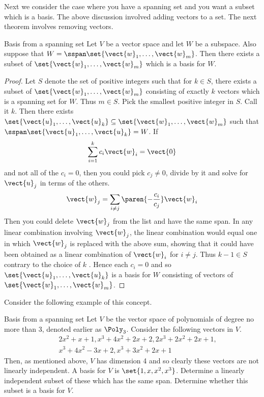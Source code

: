 Next we consider the case where you have a
spanning set and you want a subset which is a basis. The above discussion involved adding vectors to a set. The next theorem involves removing vectors. 

\begin{theorem}{Basis from a spanning set}{}
Let $V$ be a vector space and let $W$ be a subspace. Also
suppose that $W=\sspan\set{\vect{w}_{1},\ldots,\vect{w}
_{m}}$. Then there exists a subset of $\set{\vect{w}_{1},\ldots,
\vect{w}_{m}} $ which is a basis for $W$.
\end{theorem}

\begin{proof}
Let $S$ denote the set of positive integers such that for $
k\in S$, there exists a subset of $\set{\vect{w}_{1},\ldots,\vect{w}
_{m}} $ consisting of exactly $k$ vectors which is a spanning set for 
$W$. Thus $m\in S$. Pick the smallest positive integer in $S$. Call it $k$.
Then there exists $\set{\vect{u}_{1},\ldots,\vect{u}_{k}} \subseteq
\set{\vect{w}_{1},\ldots,\vect{w}_{m}} $ such that $\sspan
\set{\vect{u}_{1},\ldots,\vect{u}_{k}} =W$. If 
\begin{equation*}
\sum_{i=1}^{k}c_{i}\vect{w}_{i}=\vect{0}
\end{equation*}
and not all of the $c_{i}=0$, then you could pick $c_{j}\neq 0$, divide by
it and solve for $\vect{u}_{j}$ in terms of the others. 
\begin{equation*}
\vect{w}_{j}=\sum_{i\neq j}\paren{-\frac{c_{i}}{c_{j}}} \vect{w}_{i}
\end{equation*}
Then you could delete $\vect{w}_{j}$ from the list and have the same span.
In any linear combination involving $\vect{w}_{j}$, the linear
combination would equal one in which $\vect{w}_{j}$ is replaced with the
above sum, showing that it could have been obtained as a linear combination
of $\vect{w}_{i}$ for $i\neq j$. Thus $k-1\in S$ contrary to the choice of $k$
. Hence each $c_{i}=0$ and so $\set{\vect{u}_{1},\ldots,\vect{u}
_{k}} $ is a basis for $W$ consisting of vectors of $\set{\vect{w}
_{1},\ldots,\vect{w}_{m}}$. 
\end{proof}

Consider the following example of this concept. 

\begin{example}{Basis from a spanning set}{}
Let $V$ be the vector space of polynomials of degree no more than 3,
denoted earlier as $\Poly_{3}$. Consider the following vectors in $V$.
\begin{eqnarray*}
&&2x^{2}+x+1,x^{3}+4x^{2}+2x+2,2x^{3}+2x^{2}+2x+1, \\
&&x^{3}+4x^{2}-3x+2,x^{3}+3x^{2}+2x+1
\end{eqnarray*}
Then, as mentioned above, $V$ has dimension 4 and so clearly these vectors
are not linearly independent. A basis for $V$ is $\set{
1,x,x^{2},x^{3}}$. Determine a linearly independent subset of these
which has the same span. Determine whether this subset is a basis for $V$.
\end{example}

